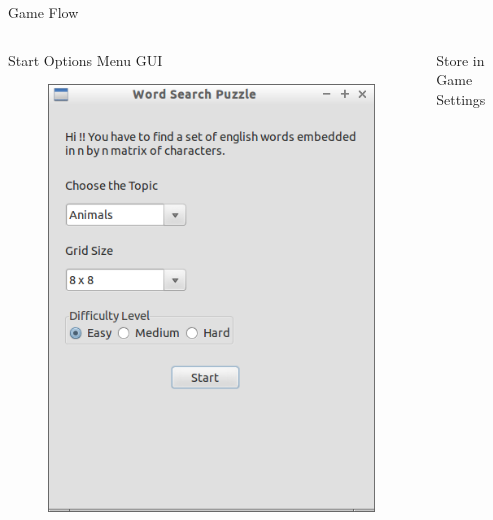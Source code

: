 \documentclass{beamer}
\begin{document}
\begin{frame}{Game Flow}
\begin{columns}[c]
\begin{column}{4cm}
\begin{tcolorbox}[colback=blue!5,colframe=blue!50!black,title=1]
\centering Start Options Menu GUI
\end{tcolorbox}
\pause
\begin{figure}
\includegraphics[scale=0.3]{opitons_gui.png}
\end{figure}
\end{column}
\pause
\begin{column}[b]{3cm}
\begin{tcolorbox}[colback=blue!5,colframe=blue!50!black, title=2]
\centering Store in \\Game Settings
\end{tcolorbox}


\end{column}
\end{columns}
\end{frame}
\end{document}

